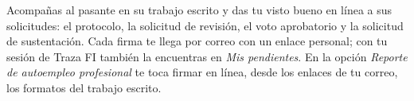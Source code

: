 \documentclass[11pt,a4paper]{article}
\begin{document}
{\small\tableofcontents}
\newpage
\begin{quevasahacer}
Acompañas al pasante en su trabajo escrito y das tu visto bueno en línea a sus solicitudes: el protocolo, la solicitud de revisión, el voto aprobatorio y la solicitud de sustentación. Cada firma te llega por correo con un enlace personal; con tu sesión de Traza FI también la encuentras en \emph{Mis pendientes}. En la opción \emph{Reporte de autoempleo profesional} te toca firmar en línea, desde los enlaces de tu correo, los formatos del trabajo escrito.
\end{quevasahacer}



\end{document}
